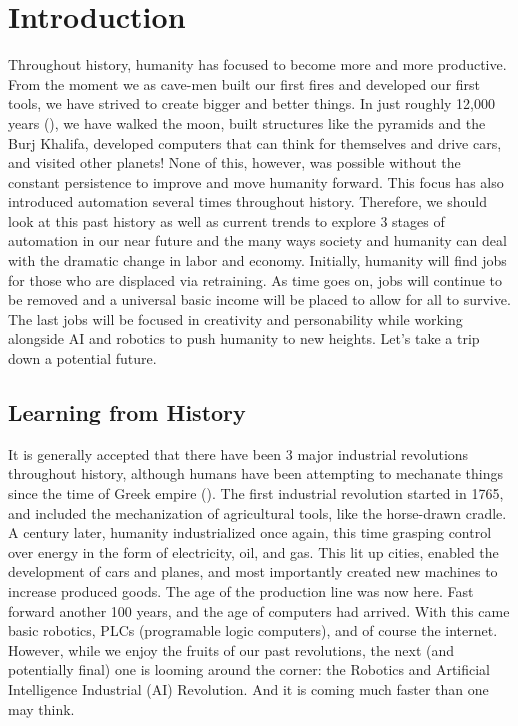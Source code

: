 \section{Introduction}

Throughout history, humanity has focused to become more and more productive. From the moment we as cave-men built our first fires and developed our first tools, we have strived to create bigger and better things. In just roughly 12,000 years (\cite{HumanHistory}), we have walked the moon, built structures like the pyramids and the Burj Khalifa, developed computers that can think for themselves and drive cars, and visited other planets! None of this, however, was possible without the constant persistence to improve and move humanity forward. This focus has also introduced automation several times throughout history. Therefore, we should look at this past history as well as current trends to explore 3 stages of automation in our near future and the many ways society and humanity can deal with the dramatic change in labor and economy. Initially, humanity will find jobs for those who are displaced via retraining. As time goes on, jobs will continue to be removed and a universal basic income will be placed to allow for all to survive. The last jobs will be focused in creativity and personability while working alongside AI and robotics to push humanity to new heights. Let's take a trip down a potential future.

\subsection{Learning from History}

It is generally accepted that there have been 3 major industrial revolutions throughout history, although humans have been attempting to mechanate things since the time of Greek empire (\cite{AutomationPeriods}). The first industrial revolution started in 1765, and included the mechanization of agricultural tools, like the horse-drawn cradle. A century later, humanity industrialized once again, this time grasping control over energy in the form of electricity, oil, and gas. This lit up cities, enabled the development of cars and planes, and most importantly created new machines to increase produced goods. The age of the production line was now here. Fast forward another 100 years, and the age of computers had arrived. With this came basic robotics, PLCs (programable logic computers), and of course the internet. However, while we enjoy the fruits of our past revolutions, the next (and potentially final) one is looming around the corner: the Robotics and Artificial Intelligence Industrial (AI) Revolution. And it is coming much faster than one may think.

